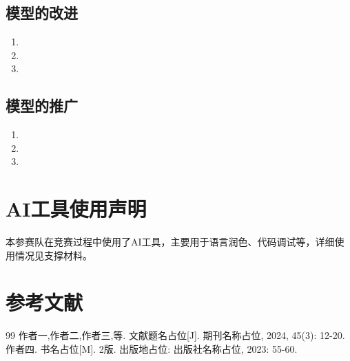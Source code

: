\documentclass{JXUSTmodeling}
\begin{document}
\subsection{模型的改进}
\begin{enumerate}[label=\arabic*., wide=0pt, labelsep=0.5em]
	\item %
	\item %
	\item %
\end{enumerate}

\subsection{模型的推广}
\begin{enumerate}[label=\arabic*., wide=0pt, labelsep=0.5em]
	\item %
	\item %
	\item %
\end{enumerate}

\section*{AI工具使用声明}
本参赛队在竞赛过程中使用了AI工具，主要用于语言润色、代码调试等，详细使用情况见支撑材料。

\section*{参考文献}
\renewcommand{\refname}{}
\vspace{-2em}
\begin{thebibliography}{99}
\setlength{\itemsep}{0pt}
作者一,作者二,作者三,等. 文献题名占位[J]. 期刊名称占位, 2024, 45(3): 12-20.
作者四. 书名占位[M]. 2版. 出版地占位: 出版社名称占位, 2023: 55-60.
\end{thebibliography}
\end{document}
